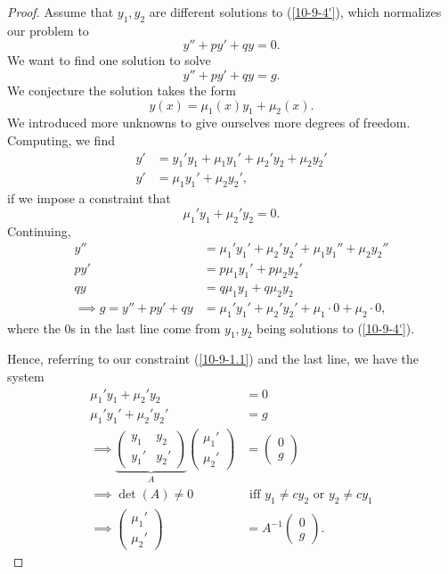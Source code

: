 \documentclass{tufte-handout}
\theoremstyle{definition}
\begin{document}
\begin{proof}
	Assume that $y_1,y_2$ are different solutions to (\ref{10-9-4'}), which normalizes our problem to \[
		y'' + py' + qy = 0
	.\] We want to find one solution to solve \[
		y'' + py' + qy = g
	.\] 
	We conjecture the solution takes the form \[
		y(x) = \mu_1(x) y_1 + \mu_2(x)
	.\] We introduced more unknowns to give ourselves more degrees of freedom.
	Computing, we find
	\begin{align*}
		y' &= y_1'y_1 + \mu_1y_1' + \mu_2'y_2 + \mu_2y_2' \\
		y' &= \mu_1y_1' + \mu_2y_2'
	,\end{align*} if we impose a constraint that 
	\begin{equation}
		\mu_1' y_1 + \mu_2'y_2 = 0. \label{10-9-1.1}
	\end{equation}
	Continuing,
	\begin{align*}
		y'' &= \mu_1'y_1' + \mu_2'y_2' + \mu_1y_1'' + \mu_2y_2'' \\
		py' &= p\mu_1y_1' + p\mu_2y_2'  \\
		qy &= q\mu_1y_1 + q\mu_2y_2 \\
		\implies g = y'' +py' + qy &= \mu_1'y_1' +\mu_2'y_2' + \mu_1 \cdot 0 + \mu_2 \cdot 0
	,\end{align*} where the $0$s in the last line come from $y_1,y_2$ being solutions to (\ref{10-9-4'}).

	Hence, referring to our constraint (\ref{10-9-1.1}) and the last line, we have the system 
	\begin{align*}
		\mu_1'y_1 + \mu_2'y_2 &= 0 \\
		\mu_1'y_1' + \mu_2'y_2' &= g \\
		\implies \underbrace{\begin{pmatrix}
		y_1 & y_2 \\
		y_1' & y_2'
	\end{pmatrix}}_{A} \begin{pmatrix}
		\mu_1'  \\
		\mu_2'
		\end{pmatrix} &= \begin{pmatrix}
		0 \\
		g
		\end{pmatrix}  \\
		\implies \det(A) \ne 0 &\text{ iff } y_1 \ne cy_2 \text{ or } y_2 \ne cy_1 \\
		\implies \begin{pmatrix}
		 \mu_1' \\
		\mu_2'
	\end{pmatrix} &= A^{-1}\begin{pmatrix}
	0 \\
	g
	\end{pmatrix} 
	.\end{align*}
\end{proof}
\end{document}
